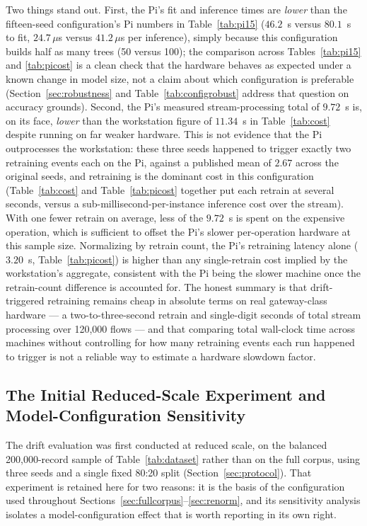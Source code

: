 \documentclass[11pt,a4paper]{article}
\begin{document}
Two things stand out. First, the Pi's fit and inference times are
\emph{lower} than the fifteen-seed configuration's Pi numbers in
Table~\ref{tab:pi15} ($46.2$~s versus $80.1$~s to fit, $24.7\,\mu$s versus
$41.2\,\mu$s per inference), simply because this configuration builds
half as many trees (50 versus 100); the comparison across
Tables~\ref{tab:pi15} and \ref{tab:picost} is a clean check that the
hardware behaves as expected under a known change in model size, not a
claim about which configuration is preferable (Section~\ref{sec:robustness}
and Table~\ref{tab:configrobust} address that question on accuracy
grounds). Second, the Pi's measured stream-processing total of
$9.72$~s is, on its face, \emph{lower} than the workstation figure of
$11.34$~s in Table~\ref{tab:cost} despite running on far weaker hardware.
This is not evidence that the Pi outprocesses the workstation: these three
seeds happened to trigger exactly two retraining events each on the Pi,
against a published mean of $2.67$ across the original seeds, and
retraining is the dominant cost in this configuration (Table~\ref{tab:cost}
and Table~\ref{tab:picost} together put each retrain at several seconds,
versus a sub-millisecond-per-instance inference cost over the stream).
With one fewer retrain on average, less of the $9.72$~s is spent on the
expensive operation, which is sufficient to offset the Pi's slower
per-operation hardware at this sample size. Normalizing by retrain count,
the Pi's retraining latency alone ($3.20$~s, Table~\ref{tab:picost}) is
higher than any single-retrain cost implied by the workstation's
aggregate, consistent with the Pi being the slower machine once the
retrain-count difference is accounted for. The honest summary is that
drift-triggered retraining remains cheap in absolute terms on real
gateway-class hardware --- a two-to-three-second retrain and single-digit
seconds of total stream processing over 120{,}000 flows --- and that
comparing total wall-clock time across machines without controlling for
how many retraining events each run happened to trigger is not a reliable
way to estimate a hardware slowdown factor.

\subsection{The Initial Reduced-Scale Experiment and Model-Configuration Sensitivity}
\label{sec:reducedscale}
\label{sec:overall}
\label{sec:phasewise}
\label{sec:robustness}

The drift evaluation was first conducted at reduced scale, on the balanced
200{,}000-record sample of Table~\ref{tab:dataset} rather than on the full
corpus, using three seeds and a single fixed 80:20 split
(Section~\ref{sec:protocol}). That experiment is retained here for two reasons:
it is the basis of the configuration used throughout
Sections~\ref{sec:fullcorpus}--\ref{sec:renorm}, and its sensitivity analysis
isolates a model-configuration effect that is worth reporting in its own right.
\end{document}
